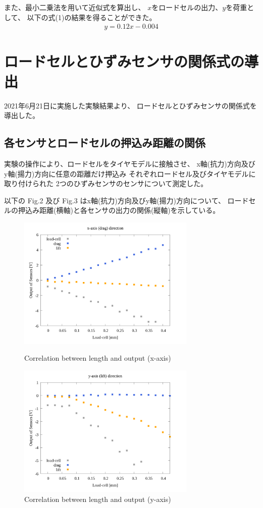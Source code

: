 \documentclass[twocolumn,a4j]{jsarticle}
\begin{document}
また、最小二乗法を用いて近似式を算出し、
$x$をロードセルの出力、$y$を荷重として、
以下の式(1)の結果を得ることができた。
\begin{eqnarray}
    y = 0.12 x - 0.004
\end{eqnarray}

\newpage

\section{ロードセルとひずみセンサの関係式の導出}
2021年6月21日に実施した実験結果より、
ロードセルとひずみセンサの関係式を導出した。\\

\subsection{各センサとロードセルの押込み距離の関係}
実験の操作により、ロードセルをタイヤモデルに接触させ、
x軸(抗力)方向及びy軸(揚力)方向に任意の距離だけ押込み
それぞれロードセル及びタイヤモデルに取り付けられた
2つのひずみセンサのセンサについて測定した。\par
以下の Fig.2 及び Fig.3 はx軸(抗力)方向及びy軸(揚力)方向について、
ロードセルの押込み距離(横軸)と各センサの出力の関係(縦軸)を示している。
\begin{figure}[htbp]
    \footnotesize
    \begin{center}
        \includegraphics[width=85mm]{../images/03_length-output_x.png}
        \caption{Correlation between length and output (x-axis)}
        \includegraphics[width=85mm]{../images/04_length-output_y.png}
        \caption{Correlation between length and output (y-axis)}
    \end{center}
\end{figure}
\end{document}

